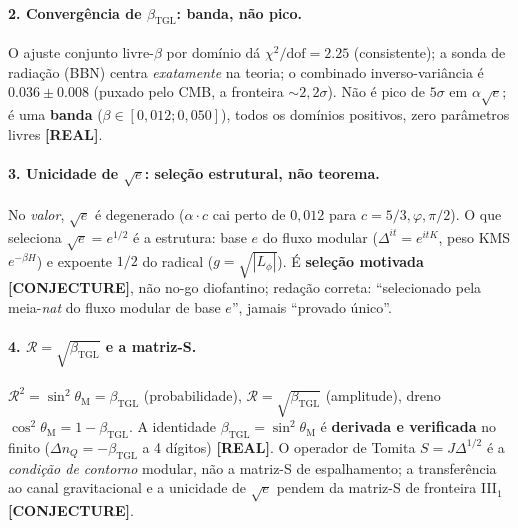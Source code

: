 \documentclass[12pt,a4paper]{article}
\newcommand{\betatgl}{\beta_{\text{TGL}}}
\begin{document}
\paragraph{2. Convergência de $\betatgl$: banda, não pico.} O ajuste conjunto livre-$\beta$ por domínio dá $\chi^2/\mathrm{dof}=2.25$ (consistente); a sonda de radiação (BBN) centra \emph{exatamente} na teoria; o combinado inverso-variância é $0.036\pm0.008$ (puxado pelo CMB, a fronteira $\sim\!2{,}2\sigma$).  Não é pico de $5\sigma$ em $\alpha\sqrt{e}$; é uma \textbf{banda} ($\beta\in[0{,}012;0{,}050]$), todos os domínios positivos, zero parâmetros livres \textbf{[REAL]}.

\paragraph{3. Unicidade de $\sqrt{e}$: seleção estrutural, não teorema.} No \emph{valor}, $\sqrt{e}$ é degenerado ($\alpha\cdot c$ cai perto de $0{,}012$ para $c=5/3,\varphi,\pi/2$).  O que seleciona $\sqrt{e}=e^{1/2}$ é a estrutura: base $e$ do fluxo modular ($\Delta^{it}=e^{itK}$, peso KMS $e^{-\beta H}$) e expoente $1/2$ do radical ($g=\sqrt{|L_\phi|}$).  É \textbf{seleção motivada [CONJECTURE]}, não no-go diofantino; redação correta: ``selecionado pela meia-\emph{nat} do fluxo modular de base $e$'', jamais ``provado único''.

\paragraph{4. $\mathcal{R}=\sqrt{\betatgl}$ e a matriz-S.} $\mathcal{R}^2=\sin^2\theta_{\mathrm{M}}=\betatgl$ (probabilidade), $\mathcal{R}=\sqrt{\betatgl}$ (amplitude), dreno $\cos^2\theta_{\mathrm{M}}=1-\betatgl$.  A identidade $\betatgl=\sin^2\theta_{\mathrm{M}}$ é \textbf{derivada e verificada} no finito ($\Delta n_Q=-\betatgl$ a 4 dígitos) \textbf{[REAL]}.  O operador de Tomita $S=J\Delta^{1/2}$ é a \emph{condição de contorno} modular, não a matriz-S de espalhamento; a transferência ao canal gravitacional e a unicidade de $\sqrt{e}$ pendem da matriz-S de fronteira III$_1$ \textbf{[CONJECTURE]}.
\end{document}
